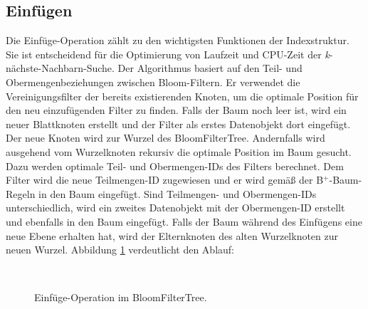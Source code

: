 \subsection{Einfügen}\label{sec:einfügen}
Die Einfüge-Operation zählt zu den wichtigsten Funktionen der Indexstruktur. Sie ist entscheidend für die Optimierung von Laufzeit und CPU-Zeit der \textit{k}-nächste-Nachbarn-Suche. Der Algorithmus basiert auf den Teil- und Obermengenbeziehungen zwischen Bloom-Filtern. Er verwendet die Vereinigungsfilter der bereits existierenden Knoten, um die optimale Position für den neu einzufügenden Filter zu finden. Falls der Baum noch leer ist, wird ein neuer Blattknoten erstellt und der Filter als erstes Datenobjekt dort eingefügt. Der neue Knoten wird zur Wurzel des BloomFilterTree. Andernfalls wird ausgehend vom Wurzelknoten rekursiv die optimale Position im Baum gesucht. Dazu werden optimale Teil- und Obermengen-IDs des Filters berechnet. Dem Filter wird die neue Teilmengen-ID zugewiesen und er wird gemäß der B$^+$-Baum-Regeln in den Baum eingefügt. Sind Teilmengen- und Obermengen-IDs unterschiedlich, wird ein zweites Datenobjekt mit der Obermengen-ID erstellt und ebenfalls in den Baum eingefügt. Falls der Baum während des Einfügens eine neue Ebene erhalten hat, wird der Elternknoten des alten Wurzelknoten zur neuen Wurzel. Abbildung \ref{fig:insert} verdeutlicht den Ablauf:  
\begin{figure}[hpbt]
  \centering
  \\
  \caption[Einfüge-Operation im BloomFilterTree]{Einfüge-Operation im BloomFilterTree.}\label{fig:insert}
\end{figure}
